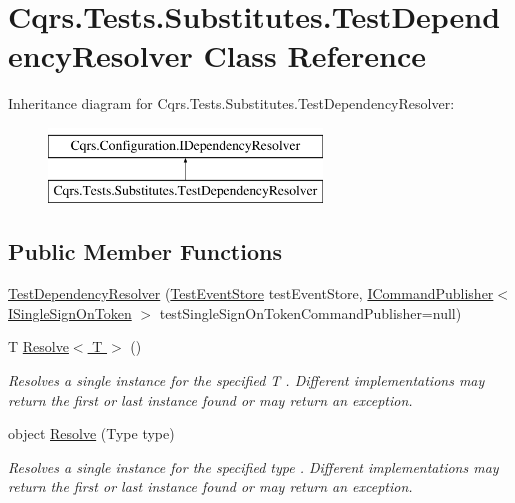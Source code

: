 \hypertarget{classCqrs_1_1Tests_1_1Substitutes_1_1TestDependencyResolver}{}\section{Cqrs.\+Tests.\+Substitutes.\+Test\+Dependency\+Resolver Class Reference}
\label{classCqrs_1_1Tests_1_1Substitutes_1_1TestDependencyResolver}
Inheritance diagram for Cqrs.\+Tests.\+Substitutes.\+Test\+Dependency\+Resolver\+:\begin{figure}[H]
\begin{center}
\leavevmode
\includegraphics[height=2.000000cm]{classCqrs_1_1Tests_1_1Substitutes_1_1TestDependencyResolver}
\end{center}
\end{figure}
\subsection*{Public Member Functions}
\begin{DoxyCompactItemize}
\item 
\hyperlink{classCqrs_1_1Tests_1_1Substitutes_1_1TestDependencyResolver_ad2c04971107ccbd80aa3f5c0440438cb_ad2c04971107ccbd80aa3f5c0440438cb}{Test\+Dependency\+Resolver} (\hyperlink{classCqrs_1_1Tests_1_1Substitutes_1_1TestEventStore}{Test\+Event\+Store} test\+Event\+Store, \hyperlink{interfaceCqrs_1_1Commands_1_1ICommandPublisher}{I\+Command\+Publisher}$<$ \hyperlink{interfaceCqrs_1_1Authentication_1_1ISingleSignOnToken}{I\+Single\+Sign\+On\+Token} $>$ test\+Single\+Sign\+On\+Token\+Command\+Publisher=null)
\item 
T \hyperlink{classCqrs_1_1Tests_1_1Substitutes_1_1TestDependencyResolver_a67090a882241fa6a881d49c91c95cad7_a67090a882241fa6a881d49c91c95cad7}{Resolve$<$ T $>$} ()
\begin{DoxyCompactList}\small\item\em Resolves a single instance for the specified {\itshape T} . Different implementations may return the first or last instance found or may return an exception. \end{DoxyCompactList}\item 
object \hyperlink{classCqrs_1_1Tests_1_1Substitutes_1_1TestDependencyResolver_a05767824475ea6affbf6f70cf5b1fd06_a05767824475ea6affbf6f70cf5b1fd06}{Resolve} (Type type)
\begin{DoxyCompactList}\small\item\em Resolves a single instance for the specified {\itshape type} . Different implementations may return the first or last instance found or may return an exception. \end{DoxyCompactList}\end{DoxyCompactItemize}
